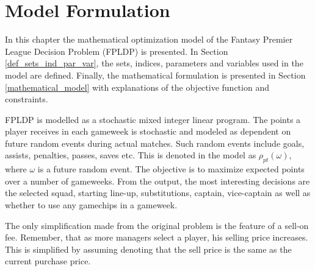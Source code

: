 
\chapter{Model Formulation} \label{chapter_model_formulation}

In this chapter the mathematical optimization model of the Fantasy Premier League Decision Problem (FPLDP) is presented. In Section \ref{def_sets_ind_par_var}, the sets, indices, parameters and variables used in the model are defined. Finally, the mathematical formulation is presented in Section \ref{mathematical_model} with explanations of the objective function and constraints. 


\newpar

FPLDP is modelled as a stochastic mixed integer linear program. The points a player receives in each gameweek is stochastic and modeled as dependent on future random events during actual matches. Such random events include goals, assists, penalties, passes, saves etc. This is denoted in the model as $\rho_{pt}(\omega)$, where $\omega$ is a future random event. The objective is to maximize expected points over a number of gameweeks. From the output, the most interesting decisions are the selected squad, starting line-up, substitutions, captain, vice-captain as well as whether to use any gamechips in a gameweek. 

\newpar

The only simplification made from the original problem is the feature of a sell-on fee. Remember, that as more managers select a player, his selling price increases. This is simplified by assuming denoting that the sell price is the same as the current purchase price. 


\begin{comment}

The only uncertainty in this problem is the number of points a player will get in each gameweek. Hence, the model is formulated accordingly. All the uncertainty lies in the objective function, and this is presented by $\rho_{pt}(\omega)$. This represents the number of points for a player $p$ in a gameweek $t$ dependent on a realization of a future event $\omega$. This event denotes all the factors deciding a player's point in a gameweek. For a goalkeeper, that includes factors such as the number of goals conceded, number of saves, penalty saved etc.

\newpar

Though the objective function is formulated in such way that it maximizes the number of expected points, once the model is solved  the objective value itself is not of interest. In the end it is the optimal team selection for a gameweek that is significant. In addition, the captain- and vice-captain choice, as well as the substitution priority are important outputs. This is reflected in the model by having small positive parameters in the objective function to ensure that these are picked accordingly. 

\end{comment}







